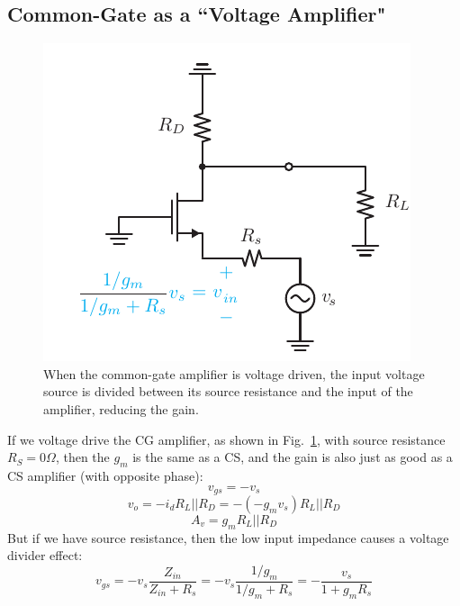\subsection{Common-Gate as a ``Voltage Amplifier"}
\begin{figure}[tb]
\centering
\includegraphics[scale=1]{cgamp_vs_ac}
\caption{When the common-gate amplifier is voltage driven, the input voltage source is divided between its source resistance and the input of the amplifier, reducing the gain.}
\label{fig:cg_v_amp}
\end{figure}
If we voltage drive the CG amplifier, as shown in Fig.~\ref{fig:cg_v_amp}, with source resistance $R_S = 0\Omega$, then the $g_m$ is the same as a CS, and the gain is also just as good as a CS amplifier (with opposite phase):
    \begin{equation}
        v_{gs} = -v_s 
    \end{equation}
    \begin{equation}
        v_{o} = - i_d R_L||R_D =  - (-g_m v_s) R_L||R_D 
    \end{equation}
    \begin{equation}
        A_v = g_m R_L||R_D
    \end{equation}
But if we have source resistance, then the low input impedance causes a voltage divider effect:
    \begin{equation}
        v_{gs} = -v_s \frac{Z_{in}}{Z_{in} + R_s} = -v_s \frac{1/g_m}{1/g_m + R_s} = - \frac{v_s}{1 + g_m R_s}
    \end{equation}
